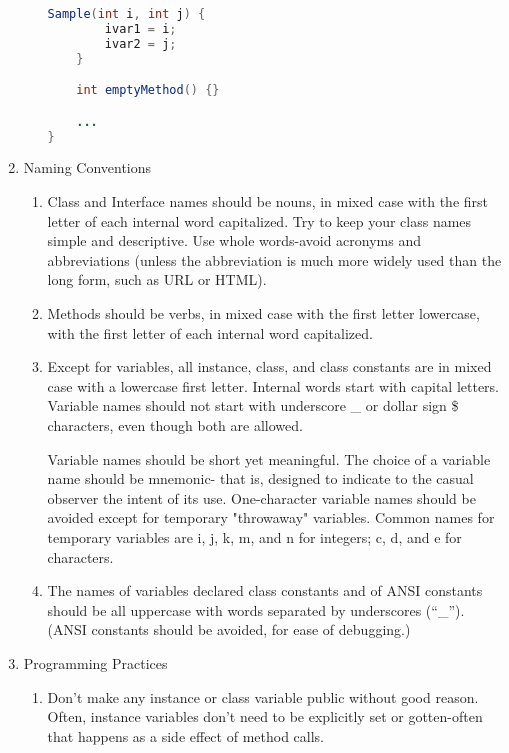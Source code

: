 \begin{enumerate}
\begin{enumerate}
\begin{lstlisting}[language=java]
    Sample(int i, int j) {
        ivar1 = i;
        ivar2 = j;
    }

    int emptyMethod() {}

    ...
}
    \end{lstlisting}
\ifslides
\newpage
\fi
\end{enumerate}
\setcounter{enumi}{9}
\item Naming Conventions
\begin{enumerate}
\item Class and Interface names should be nouns, in mixed case with the first
  letter of each
  internal word capitalized. Try to keep your class names simple and
  descriptive. Use whole words-avoid acronyms and abbreviations (unless the
  abbreviation is much more widely used than the long form, such as URL or
  HTML).
\item Methods should be verbs, in mixed case with the first letter lowercase,
  with the first letter of each internal word capitalized.
\ifslides
\newpage
\fi
\item  Except for variables, all instance, class, and class constants are in
  mixed case with a lowercase first letter. Internal words start with capital
  letters. Variable names should not start with underscore \_ or dollar sign \$
  characters, even though both are allowed.

  Variable names should be short yet meaningful. The choice of a variable name
  should be mnemonic- that is, designed to indicate to the casual observer the
  intent of its use. One-character variable names should be avoided except for
  temporary "throwaway" variables. Common names for temporary variables are i,
  j, k, m, and n for integers; c, d, and e for characters.
\item  The names of variables declared class constants and of ANSI constants
  should be all uppercase with words separated by underscores (``\_''). (ANSI
  constants should be avoided, for ease of debugging.)
\end{enumerate}
\ifslides
\newpage
\fi
\item Programming Practices
  \begin{enumerate}
  \item Don't make any instance or class variable public without good
  reason. Often, instance variables don't need to be explicitly set or
  gotten-often that happens as a side effect of method calls.


\end{enumerate}
\end{enumerate}

